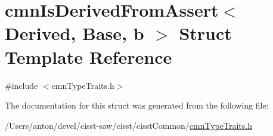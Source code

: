 \hypertarget{structcmn_is_derived_from_assert}{}\section{cmn\+Is\+Derived\+From\+Assert$<$ Derived, Base, b $>$ Struct Template Reference}
\label{structcmn_is_derived_from_assert}


{\ttfamily \#include $<$cmn\+Type\+Traits.\+h$>$}



The documentation for this struct was generated from the following file\+:\begin{DoxyCompactItemize}
\item 
/\+Users/anton/devel/cisst-\/saw/cisst/cisst\+Common/\hyperlink{cmn_type_traits_8h}{cmn\+Type\+Traits.\+h}\end{DoxyCompactItemize}
